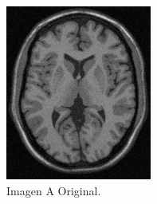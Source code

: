 \documentclass[letterpaper,12pt]{article}
\theoremstyle{plain}
\begin{document}
\begin{figure}[H]
   \centering
        \begin{subfigure}[h]{0.2\textwidth}
           \centering
           \includegraphics[width=\textwidth]{Figuras/ImagenA.png}
           \caption{Imagen A Original.} 
        \end{subfigure}
        \begin{subfigure}[h]{0.2\textwidth}
           \centering

\end{subfigure}
\end{figure}
\end{document}
